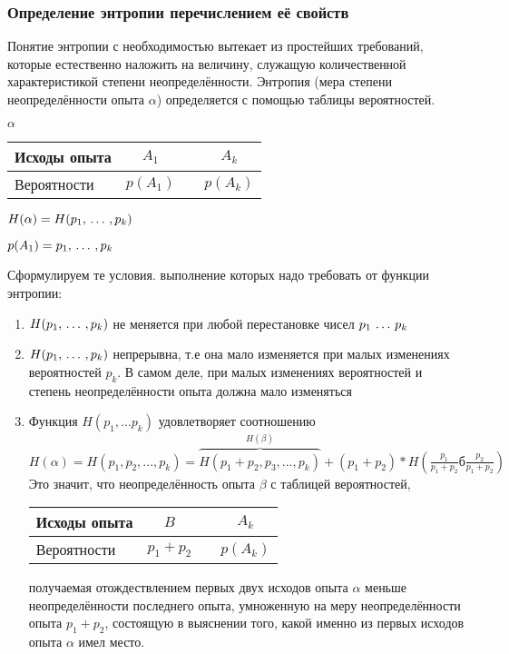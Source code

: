 \documentclass[a4paper,12pt]{report}
\begin{document}
	
	\subsubsection{Определение энтропии перечислением её свойств}
	
	Понятие энтропии с необходимостью вытекает из простейших требований, которые естественно наложить на величину, служащую количественной характеристикой степени неопределённости. Энтропия (мера степени неопределённости опыта $\alpha$) определяется с помощью таблицы вероятностей. 
	

	$\alpha$
	
	\begin{tabular}{|l|c|c|c|}
	\hline
	Исходы опыта & $A_1$ & \sudots & $A_k$ \\
	\hline
	Вероятности  & $p(A_1)$ & \sudots & $p(A_k)$\\
	\hline
	\end{tabular}
	
	
	$H(\alpha) = H(p_1,\,\ldots\, , p_k)$
	
	$p(A_1) = p_1, \,\ldots\, , p_k$
	
	Сформулируем те условия. выполнение которых надо требовать от функции энтропии:
	
	\begin{enumerate}
	
	\item	$H(p_1, \,\ldots\, ,p_k)$ не меняется при любой перестановке чисел $p_1 \,\ldots\, p_k$

	\item	$H(p_1, \,\ldots\, ,p_k)$ непрерывна, т.е она мало изменяется при малых изменениях вероятностей $p_k$. В самом деле, при малых изменениях вероятностей и степень неопределённости опыта должна мало изменяться

	\item	Функция $H(p_1,...p_k)$ удовлетворяет соотношению 
		$
		  H(\alpha) = H(p_1,p_2,...,p_k) 
		            = \overbrace{H(p_1+p_2,p_3,...,p_k)}^{H(\beta)} + (p_1+p_2) 
		            * H(\frac{p_1}{p_1+p_2}б\frac{p_2}{p_1+p_2})
		$
	Это значит, что неопределённость опыта $\beta$ с таблицей вероятностей,
	
		\begin{tabular}{|l|c|c|c|}
		\hline
		Исходы опыта & $B$ & \sudots & $A_k$\\
		\hline		
		Вероятности  & $p_1+p_2$ & \sudots & $p(A_k)$\\
		\hline
		\end{tabular}
		
	получаемая отождествлением первых двух исходов опыта $\alpha$ меньше неопределённости последнего опыта, умноженную на меру неопределённости опыта $p_1+p_2$, состоящую в выяснении того, какой именно из первых исходов опыта $\alpha$ имел место.
	\end{enumerate}		 
\end{document}
